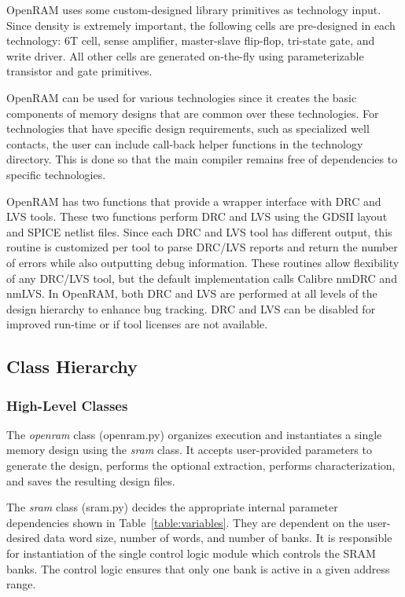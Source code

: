 OpenRAM uses some custom-designed library primitives as technology
input. Since density is extremely important, the following cells are
pre-designed in each technology: 6T cell, sense amplifier,
master-slave flip-flop, tri-state gate, and write driver. All other
cells are generated on-the-fly using parameterizable transistor and
gate primitives.

OpenRAM can be used for various technologies since it creates the
basic components of memory designs that are common over these
technologies. For technologies that have specific design requirements,
such as specialized well contacts, the user can include call-back
helper functions in the technology directory. This is done so that the
main compiler remains free of dependencies to specific technologies.

OpenRAM has two functions that provide a wrapper interface with DRC
and LVS tools. These two functions perform DRC and LVS using the GDSII
layout and SPICE netlist files. Since each DRC and LVS tool has
different output, this routine is customized per tool to parse DRC/LVS
reports and return the number of errors while also outputting debug
information. These routines allow flexibility of any DRC/LVS tool,
but the default implementation calls Calibre nmDRC and nmLVS. In
OpenRAM, both DRC and LVS are performed at all levels of the design
hierarchy to enhance bug tracking. DRC and LVS can be disabled for
improved run-time or if tool licenses are not available.

\subsection{Class Hierarchy}

\subsubsection{High-Level Classes}

The {\it openram} class (openram.py) organizes execution and
instantiates a single memory design using the {\it sram} class. It
accepts user-provided parameters to generate the design, performs the
optional extraction, performs characterization, and saves the
resulting design files.

The {\it sram} class (sram.py) decides the appropriate internal parameter
dependencies shown in Table~\ref{table:variables}. They are dependent 
on the user-desired data word size, number of words, and number of banks.
It is responsible for instantiation of the single control logic module which
controls the SRAM banks. The control logic ensures that only one bank
is active in a given address range.

